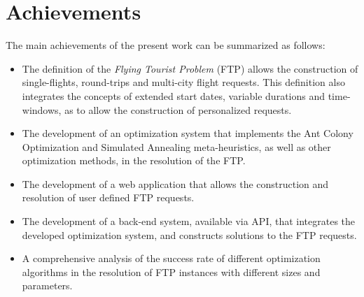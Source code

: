 

\section{Achievements}

The main achievements of the present work can be summarized as follows:

\begin{itemize}
    \item 
    
    The definition of the \textit{Flying Tourist Problem} (FTP) allows the construction of single-flights, round-trips and multi-city flight requests. This definition also integrates the concepts of extended start dates, variable durations and time-windows, as to allow the construction of personalized requests. 
    
    \item The development of an optimization system that implements the Ant Colony Optimization and Simulated Annealing meta-heuristics, as well as other optimization methods, in the resolution of the FTP.
    
    \item 
    The development of a web application that allows the construction and resolution of user defined FTP requests.  

    \item The development of a back-end system, available via API, that integrates the developed optimization system, and constructs solutions to the FTP requests.
    
    \item 
    A comprehensive analysis of the success rate of different optimization algorithms in the resolution of FTP instances with different sizes and parameters.

\end{itemize}

